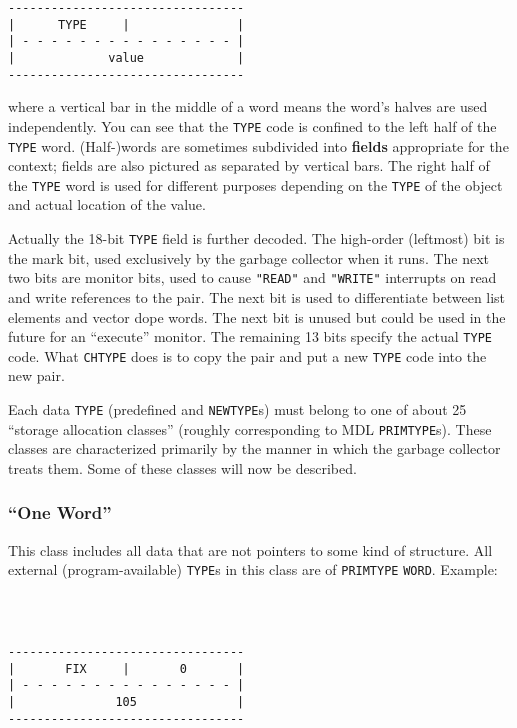 \documentclass[a4paper]{scrbook}
\begin{document}
\begin{verbatim}
---------------------------------
|      TYPE     |               |
| - - - - - - - - - - - - - - - |
|             value             |
---------------------------------
\end{verbatim}

where a vertical bar in the middle of a word means the word's halves are used independently. You can see that the
\texttt{TYPE} code is confined to the left half of the \texttt{TYPE} word. (Half-)words are sometimes subdivided into
\textbf{fields} appropriate for the context; fields are also pictured as separated by vertical bars. The right half of the
\texttt{TYPE} word is used for different purposes depending on the \texttt{TYPE} of the object and actual location of the
value.

Actually the 18-bit \texttt{TYPE} field is further decoded. The high-order (leftmost) bit is the mark bit, used exclusively
by the garbage collector when it runs. The next two bits are monitor bits, used to cause \texttt{"READ"}
 and \texttt{"WRITE"}  interrupts on read and write references to
the pair. The next bit is used to differentiate between list elements and vector dope words. The next bit is unused but
could be used in the future for an ``execute'' monitor. The remaining 13 bits specify the actual \texttt{TYPE} code. What
\texttt{CHTYPE} does is to copy the pair and put a new \texttt{TYPE} code into the new pair.

Each data \texttt{TYPE} (predefined and \texttt{NEWTYPE}s) must belong to one of about 25 ``storage allocation classes''
(roughly corresponding to MDL \texttt{PRIMTYPE}s). These classes are characterized primarily by the manner in which the
garbage collector treats them. Some of these classes will now be described.

\subsubsection*{\texorpdfstring{``One Word''}{One Word}}\label{one-word}

This class includes all data that are not pointers to some kind of structure. All external (program-available)
\texttt{TYPE}s in this class are of \texttt{PRIMTYPE} \texttt{WORD}. Example:

\begin{verbatim}



---------------------------------
|       FIX     |       0       |
| - - - - - - - - - - - - - - - |
|              105              |
---------------------------------
\end{verbatim}
\end{document}
